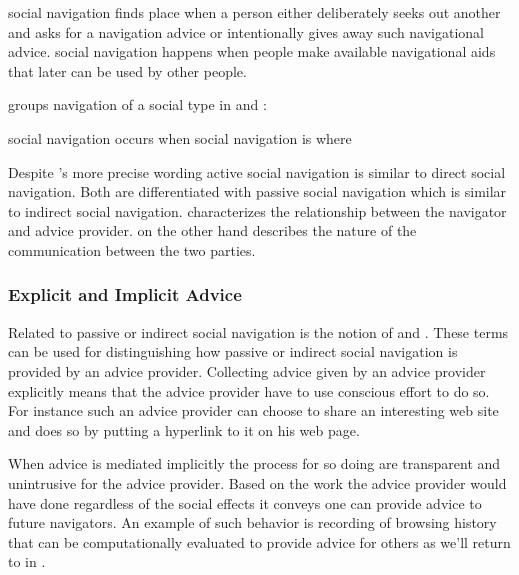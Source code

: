 \begin{items}
   social navigation finds place when a person either
    deliberately seeks out another and asks for a navigation advice or
    intentionally gives away such navigational advice.
   social navigation happens when people make available
    navigational aids that later can be used by other people.
\end{items}

\citeauthor{svensson03} groups navigation of a social type in
 and :

\begin{items}
   social navigation occurs when
   social navigation is where
\end{items}

Despite \citeauthor{svensson03}'s more precise wording active social
navigation is similar to direct social navigation. Both are differentiated
with passive social navigation which is similar to indirect social navigation.
\citeauthor{dieberger97} characterizes the relationship between the
navigator and advice provider. \citeauthor{svensson03} on the other hand
describes the nature of the communication between the two parties.

\subsubsection{Explicit and Implicit Advice}

Related to passive or indirect social navigation is the notion
of  and .
These terms can be used for distinguishing how
passive or indirect social navigation is provided by an advice provider.
Collecting advice given by an advice provider explicitly means that
the advice provider have to use conscious effort to do so. For instance such
an advice provider can choose to share an interesting web site and does so by
putting a hyperlink to it on his web page.

When advice is mediated implicitly the process for so doing are transparent
and unintrusive for the advice provider. Based on the work the advice provider
would have done regardless of the social effects it conveys one can provide
advice to future navigators. An example of such behavior is recording of
browsing history that can be computationally evaluated to provide advice for
others as we'll return to in
.

